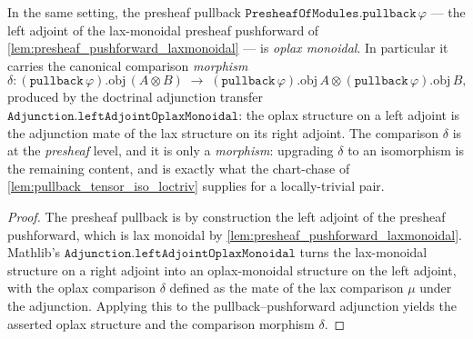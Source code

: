 \begin{lemma}


  \label{lem:presheaf_pullback_oplaxmonoidal}
  In the same setting, the presheaf pullback \(\mathtt{PresheafOfModules.pullback}\,\varphi\)
  --- the left adjoint of the lax-monoidal presheaf pushforward of
  \cref{lem:presheaf_pushforward_laxmonoidal} --- is \emph{oplax monoidal}. In
  particular it carries the canonical comparison \emph{morphism}
  \[
    \delta :
      (\mathtt{pullback}\,\varphi).\mathrm{obj}\,(A \otimes B)
      \;\longrightarrow\;
      (\mathtt{pullback}\,\varphi).\mathrm{obj}\,A
        \otimes (\mathtt{pullback}\,\varphi).\mathrm{obj}\,B,
  \]
  produced by the doctrinal adjunction transfer
  \(\mathtt{Adjunction.leftAdjointOplaxMonoidal}\): the oplax structure on a left
  adjoint is the adjunction mate of the lax structure on its right adjoint. The
  comparison \(\delta\) is at the \emph{presheaf} level, and it is only a
  \emph{morphism}: upgrading \(\delta\) to an isomorphism is the remaining content, and
  is exactly what the chart-chase of \cref{lem:pullback_tensor_iso_loctriv}
  supplies for a locally-trivial pair.
\end{lemma}

\begin{proof}
  \leanok
  The presheaf pullback is by construction the left adjoint of the presheaf pushforward,
  which is lax monoidal by \cref{lem:presheaf_pushforward_laxmonoidal}. Mathlib's
  \(\mathtt{Adjunction.leftAdjointOplaxMonoidal}\) turns the lax-monoidal structure on a
  right adjoint into an oplax-monoidal structure on the left adjoint, with the oplax
  comparison \(\delta\) defined as the mate of the lax comparison \(\mu\) under the
  adjunction. Applying this to the pullback--pushforward adjunction yields the asserted
  oplax structure and the comparison morphism \(\delta\).
\end{proof}


